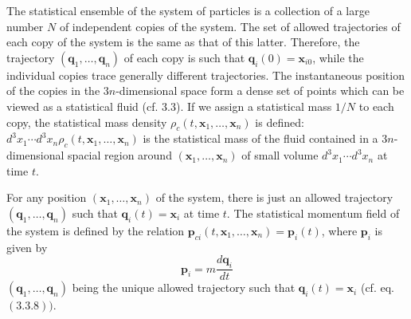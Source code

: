 \documentclass{article}
\begin{document}
The statistical ensemble of the system of particles is a collection of a large number $N$ of independent copies of the system. The set of allowed trajectories
of each copy of the system is the same as that of this latter. Therefore, the trajectory $\left(\boldsymbol{q}_{1}, \ldots, \boldsymbol{q}_{n}\right)$ of each copy is such that $\boldsymbol{q}_{i}(0)=\boldsymbol{x}_{i 0}$, while the individual copies trace generally different trajectories. The instantaneous position of the copies in the $3 n$-dimensional space form a dense set of points which can be viewed as a statistical fluid (cf. 3.3). If we assign a statistical mass $1 / N$ to each copy, the statistical mass density $\rho_{c}\left(t, \boldsymbol{x}_{1}, \ldots, \boldsymbol{x}_{n}\right)$ is defined: $d^{3} x_{1} \cdots d^{3} x_{n} \rho_{c}\left(t, \boldsymbol{x}_{1}, \ldots, \boldsymbol{x}_{n}\right)$ is the statistical mass of the fluid contained in a $3 n$-dimensional spacial region around $\left(\boldsymbol{x}_{1}, \ldots, \boldsymbol{x}_{n}\right)$ of small volume $d^{3} x_{1} \cdots d^{3} x_{n}$ at time $t$.

For any position $\left(\boldsymbol{x}_{1}, \ldots, \boldsymbol{x}_{n}\right)$ of the system, there is just an allowed trajectory $\left(\boldsymbol{q}_{1}, \ldots, \boldsymbol{q}_{n}\right)$ such that $\boldsymbol{q}_{i}(t)=\boldsymbol{x}_{i}$ at time $t$. The statistical momentum field of the system is defined by the relation $\boldsymbol{p}_{c i}\left(t, \boldsymbol{x}_{1}, \ldots, \boldsymbol{x}_{n}\right)=\boldsymbol{p}_{i}(t)$, where $\boldsymbol{p}_{i}$ is given by
$$
\begin{equation*}
\boldsymbol{p}_{i}=m \frac{d \boldsymbol{q}_{i}}{d t} \tag{3.20.2}
\end{equation*}
$$
$\left(\boldsymbol{q}_{1}, \ldots, \boldsymbol{q}_{n}\right)$ being the unique allowed trajectory such that $\boldsymbol{q}_{i}(t)=\boldsymbol{x}_{i}$ (cf. eq. $(3.3 .8))$.
\end{document}
